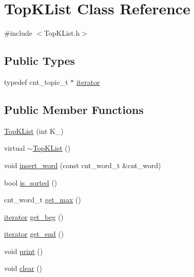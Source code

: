 \hypertarget{class_top_k_list}{
\section{TopKList Class Reference}
\label{class_top_k_list}
}


{\ttfamily \#include $<$TopKList.h$>$}

\subsection*{Public Types}
\begin{DoxyCompactItemize}
\item 
typedef cnt\_\-topic\_\-t $\ast$ \hyperlink{class_top_k_list_ab5af055ff82cd242e13445917a847b43}{iterator}
\end{DoxyCompactItemize}
\subsection*{Public Member Functions}
\begin{DoxyCompactItemize}
\item 
\hyperlink{class_top_k_list_a0a0f42241693e2905d1e88612756e915}{TopKList} (int K\_\-)
\item 
virtual \hyperlink{class_top_k_list_a38ffabab2bb7a66817462e2446099faf}{$\sim$TopKList} ()
\item 
void \hyperlink{class_top_k_list_a04d9d3639b61dcf3587a7595532846ed}{insert\_\-word} (const cnt\_\-word\_\-t \&cnt\_\-word)
\item 
bool \hyperlink{class_top_k_list_a29d4e49e4c5338f203e5228c6d7bb68e}{is\_\-sorted} ()
\item 
cnt\_\-word\_\-t \hyperlink{class_top_k_list_abab1ed86b746442e81eed7ba4235da21}{get\_\-max} ()
\item 
\hyperlink{class_top_k_list_ab5af055ff82cd242e13445917a847b43}{iterator} \hyperlink{class_top_k_list_ae2411dfb7c1fa91c9a28b8787e50b622}{get\_\-beg} ()
\item 
\hyperlink{class_top_k_list_ab5af055ff82cd242e13445917a847b43}{iterator} \hyperlink{class_top_k_list_a10dc87d4db7605d2afe754a620d10892}{get\_\-end} ()
\item 
void \hyperlink{class_top_k_list_af7ac4cc51231315ba1a67a92a66683f9}{print} ()
\item 
void \hyperlink{class_top_k_list_a4d7e1f2f37373b4b0ff1afd14b2e46fd}{clear} ()
\end{DoxyCompactItemize}



